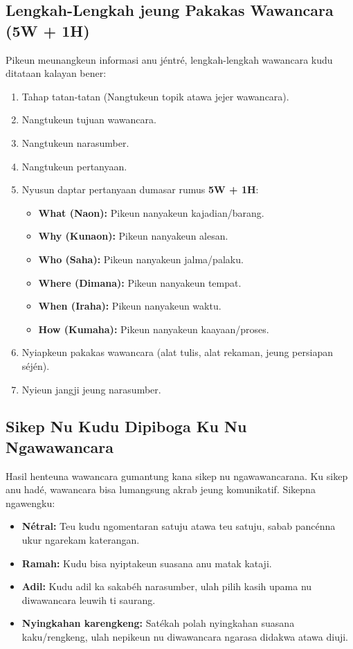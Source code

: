 \documentclass[12pt, a4paper]{article}
\begin{document}
\subsection{Lengkah-Lengkah jeung Pakakas Wawancara (5W + 1H)}
Pikeun meunangkeun informasi anu jéntré, lengkah-lengkah wawancara kudu ditataan kalayan bener:
\begin{enumerate}
    \item Tahap tatan-tatan (Nangtukeun topik atawa jejer wawancara).
    \item Nangtukeun tujuan wawancara.
    \item Nangtukeun narasumber.
    \item Nangtukeun pertanyaan.
    \item Nyusun daptar pertanyaan dumasar rumus \textbf{5W + 1H}:
    \begin{itemize}
        \item \textbf{What (Naon):} Pikeun nanyakeun kajadian/barang.
        \item \textbf{Why (Kunaon):} Pikeun nanyakeun alesan.
        \item \textbf{Who (Saha):} Pikeun nanyakeun jalma/palaku.
        \item \textbf{Where (Dimana):} Pikeun nanyakeun tempat.
        \item \textbf{When (Iraha):} Pikeun nanyakeun waktu.
        \item \textbf{How (Kumaha):} Pikeun nanyakeun kaayaan/proses.
    \end{itemize}
    \item Nyiapkeun pakakas wawancara (alat tulis, alat rekaman, jeung persiapan séjén).
    \item Nyieun jangji jeung narasumber.
\end{enumerate}

\subsection{Sikep Nu Kudu Dipiboga Ku Nu Ngawawancara}
Hasil henteuna wawancara gumantung kana sikep nu ngawawancarana. Ku sikep anu hadé, wawancara bisa lumangsung akrab jeung komunikatif. Sikepna ngawengku:
\begin{itemize}
    \item \textbf{Nétral:} Teu kudu ngomentaran satuju atawa teu satuju, sabab pancénna ukur ngarekam katerangan.
    \item \textbf{Ramah:} Kudu bisa nyiptakeun suasana anu matak kataji.
    \item \textbf{Adil:} Kudu adil ka sakabéh narasumber, ulah pilih kasih upama nu diwawancara leuwih ti saurang.
    \item \textbf{Nyingkahan karengkeng:} Satékah polah nyingkahan suasana kaku/rengkeng, ulah nepikeun nu diwawancara ngarasa didakwa atawa diuji.
\end{itemize}
\end{document}
